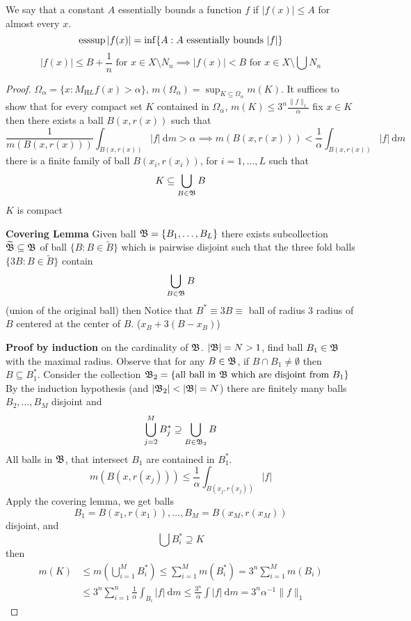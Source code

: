 We say that a constant $A$ essentially bounds a function $f$ if 
$|f(x)| \le A$ for almost every $x$.
\[\operatorname*{ess sup} |f(x)| = \inf \{A : A \text{ essentially bounds } |f|\}\]
\[|f(x)| \le B + \frac1n \text{ for } x\in X \setminus N_n \implies |f(x)| < B \text{ for } x \in X \setminus \bigcup N_n\]

\begin{proof}
  $\Omega_\alpha = \{x : M_{\mathrm HL}f(x) > \alpha\}$,
  $m(\Omega_\alpha) = \sup_{K \subseteq \Omega_\alpha} m(K)$.
  It suffices to show that for every compact set $K$ contained in $\Omega_\alpha$, 
  $m(K) \le 3^n \frac{\|f\|_1}\alpha$
  fix $x \in K$ then there exists a ball $B(x, r(x))$ such that 
  \[\frac1{m(B(x, r(x)))} \int_{B(x, r(x))} |f| \ \mathrm{d}m> \alpha \implies m(B(x, r(x))) < \frac1\alpha\int_{{B(x, r(x))}} |f| \ \mathrm dm\]
  there is a finite family of ball $B(x_i, r(x_i))$, for $i = 1, \dotsc, L$ such that 
  \[K \subseteq \bigcup_{B \in \mathfrak B} B\]
  $K$ is compact

  \textbf{Covering Lemma} Given ball $\mathfrak B = \{B_1, \dotsc, B_L\}$ there exists subcollection $\widetilde{\mathfrak B} \subseteq \mathfrak B$
  of ball $\{B : B \in \widetilde{B}\}$ which is pairwise disjoint such that the three fold balls
  $\{3B : B \in \widetilde{B}\}$ contain 
  \[\bigcup_{B \in \mathfrak B} B\]
  (union of the original ball) then
  Notice that $B^* \equiv 3B\equiv$ ball of radius 3 radius of $B$ centered at the center of $B$.
  ($x_B + 3(B - x_B)$) 

  \textbf{Proof by induction} on the cardinality of $\mathfrak B$. $|\mathfrak B| = N > 1$,
  find ball $B_1 \in \mathfrak B$ with the maximal radius. Observe that for any $B \in \mathfrak B$, if $B \cap B_1 \neq \emptyset$
  then $B \subseteq B_1^*$.
  Consider the collection $\mathfrak B_{2} = \{\text{all ball in } \mathfrak B \text{ which are disjoint from }B_1\}$
  By the induction hypothesis (and $|\mathfrak B_2| < |\mathfrak B| = N$)
  there are finitely many balls $B_2, \dotsc, B_M$ disjoint and 
  \[\bigcup_{j=2}^M B_j^* \supseteq \bigcup_{B \in \mathfrak B_2}B\]
  All balls in $\mathfrak B$, that intersect $B_1$ are contained in $B_1^*$.
  \[m(B(x, r(x_j))) \le \frac1\alpha \int_{B(x_j, r(x_j))} |f|\]
  Apply the covering lemma, we get balls
  \[B_1 = B(x_1, r(x_1)), \dotsc, B_M = B(x_M, r(x_M))\]
  disjoint, and 
  \[\bigcup B_i^* \supseteq K\]
  then 
  \begin{align*}
    m(K) &\le m\left(\bigcup_{i=1}^M B_i^*\right) 
    \le \sum_{i=1}^M m(B_i^*)  = 3^n \sum_{i=1}^Mm(B_i) \\
    &\le 3^n\sum_{i=1}^n\frac1\alpha \int_{B_i} |f| \ \mathrm{d}m\le \frac{3^n}\alpha \int|f|\ \mathrm{d}m = 3^n\alpha^{-1}\|f\|_{1}
  \end{align*}
\end{proof}



